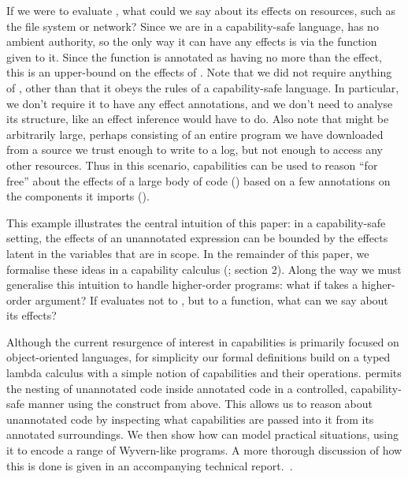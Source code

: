 If we were to evaluate , what could we say about its effects on resources, such as the file system or network? Since we are in a capability-safe language,  has no ambient authority, so the only way it can have any effects is via the  function given to it. Since the  function is annotated as having no more than the  effect, this is an upper-bound on the effects of . Note that we did not require anything of , other than that it obeys the rules of a capability-safe language. In particular, we don't require it to have any effect annotations, and we don't need to analyse its structure, like an effect inference would have to do. Also note that  might be arbitrarily large, perhaps consisting of an entire program we have downloaded from a source we trust enough to write to a log, but not enough to access any other resources. Thus in this scenario, capabilities can be used to reason ``for free'' about the effects of a large body of code () based on a few annotations on the components it imports ().

This example illustrates the central intuition of this paper: in a capability-safe setting,
the effects of an unannotated expression can be bounded by the effects latent in the
variables that are in scope. In the remainder of this paper, we formalise these ideas in a capability calculus (; section 2). Along the way we must generalise this intuition to handle higher-order programs: what if  takes a higher-order argument? If  evaluates not to , but to a function, what can we say about its effects?

Although the current resurgence of interest in capabilities is primarily focused on object-oriented languages, for simplicity our formal definitions build on a typed lambda calculus with a simple notion of capabilities and their operations.  permits the nesting of unannotated code inside annotated code in a controlled, capability-safe manner using the  construct from above. This allows us to reason about unannotated code by inspecting what capabilities are passed into it from its annotated surroundings. We then show how  can model practical situations, using it to encode a range of Wyvern-like programs. A more thorough discussion of how this is done is given in an accompanying technical report.~\cite{ecs:2018:aaron-tr}.
